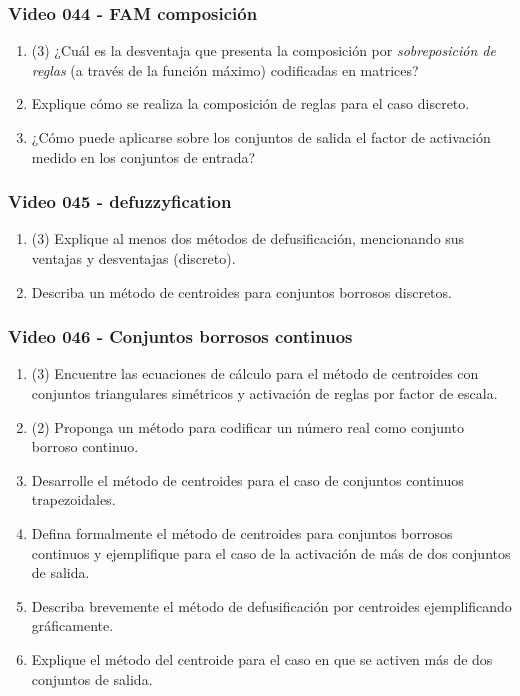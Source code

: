 \documentclass[a4paper,10pt,spanish]{article}
\begin{document}
\subsubsection{Video 044 - FAM composición}

\begin{enumerate}
\item (3) ¿Cuál es la desventaja que presenta la composición por \textit{sobreposición de reglas} (a través de la función máximo) codificadas en matrices?

\item Explique cómo se realiza la composición de reglas para el caso discreto.

\item ¿Cómo puede aplicarse sobre los conjuntos de salida el factor de activación medido en los conjuntos de entrada?
\end{enumerate}

\subsubsection{Video 045 - defuzzyfication}

\begin{enumerate}
\item (3) Explique al menos dos métodos de defusificación, mencionando sus ventajas y desventajas (discreto).

\item Describa un método de centroides para conjuntos borrosos discretos.
\end{enumerate}

\subsubsection{Video 046 - Conjuntos borrosos continuos}

\begin{enumerate}
\item (3) Encuentre las ecuaciones de cálculo para el método de centroides con conjuntos triangulares simétricos y activación de reglas por factor de escala.

\item (2) Proponga un método para codificar un número real como conjunto borroso continuo.

\item Desarrolle el método de centroides para el caso de conjuntos continuos trapezoidales.

\item Defina formalmente el método de centroides para conjuntos borrosos continuos y ejemplifique para el caso de la activación de más de dos conjuntos de salida.

\item Describa brevemente el método de defusificación por centroides ejemplificando gráficamente.

\item Explique el método del centroide para el caso en que se activen más de dos conjuntos de salida.
\end{enumerate}
\end{document}
